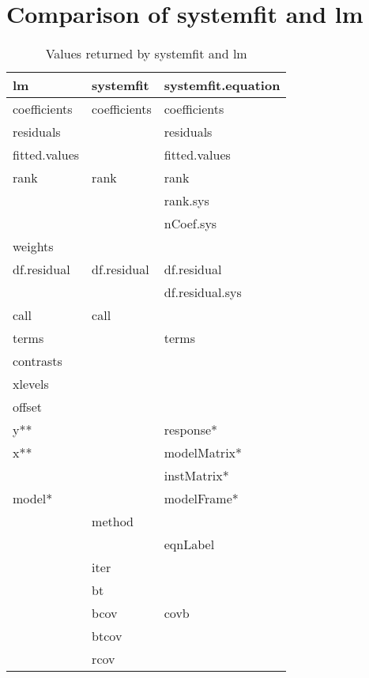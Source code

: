 \section{Comparison of systemfit and lm}

\begin{table}[htbp]
\caption{Values returned by systemfit and lm}
\begin{tabular}{lll}
\hline
lm & systemfit & systemfit.equation \\
\hline
coefficients    & coefficients   & coefficients \\
residuals       &                & residuals \\
fitted.values   &                & fitted.values \\
rank            & rank           & rank \\
                &                & rank.sys \\
                &                & nCoef.sys \\
weights         &                & \\
df.residual     & df.residual    & df.residual \\
                &                & df.residual.sys \\
call            & call           & \\
terms           &                & terms \\
contrasts       &                & \\
xlevels         &                & \\
offset          &                & \\
y**             &                & response* \\
x**             &                & modelMatrix* \\
                &                & instMatrix* \\
model*          &                & modelFrame* \\
                & method         & \\
                &                & eqnLabel \\
                & iter           & \\
                & bt             & \\
                & bcov           & covb \\
                & btcov          & \\
                & rcov           & \\

\end{tabular}
\end{table}
